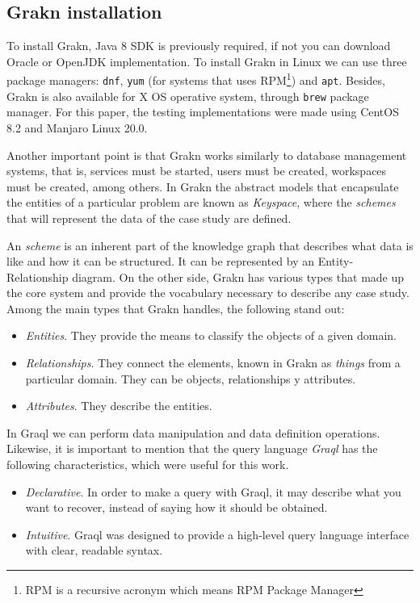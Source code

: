 \subsection{Grakn installation}

To install Grakn, Java 8 SDK is previously required, if not you can download Oracle or OpenJDK implementation. To install Grakn in Linux we can use three package managers: \texttt{dnf}, \texttt{yum} (for systems that uses RPM\footnote{RPM is a recursive acronym which means RPM Package Manager}) and \texttt{apt}. Besides, Grakn is also available for X OS operative system,  through \texttt{brew} package manager. For this paper, the testing implementations were made using CentOS 8.2 and Manjaro Linux 20.0.

Another important point is that Grakn works similarly to database management systems, that is, services must be started, users must be created, workspaces must be created, among others. In Grakn the abstract models that encapsulate the entities of a particular problem are known as \textit{Keyspace}, where the \textit{schemes} that will represent the data of the case study are defined.

An \textit{scheme} is an inherent part of the knowledge graph that describes what data is like and how it can be structured. It can be represented by an Entity-Relationship diagram. On the other side, Grakn has various types that made up the core system and provide the vocabulary necessary to describe any case study. Among the main types that Grakn handles, the following stand out:

\begin{itemize}
    \item \textit{Entities}. They provide the means to classify the objects of a given domain.
    \item \textit{Relationships}. They connect the elements, known in Grakn as \textit{things} from a particular domain. They can be objects, relationships y attributes.
    \item \textit{Attributes}. They describe the entities.
\end{itemize}

In Graql we can perform data manipulation and data definition operations.
Likewise, it is important to mention that the query language \textit{Graql} has the following characteristics, which were useful for this work.

\begin{itemize}
    \item \textit{Declarative}. In order to make a query with Graql, it may describe what you want to recover, instead of saying how it should be obtained.
    \item \textit{Intuitive}. Graql was designed to provide a high-level query language interface with clear, readable syntax.
\end{itemize}

